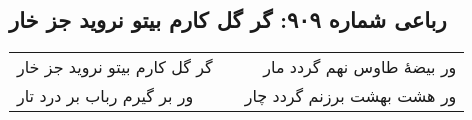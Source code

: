 \begin{center}
\section*{رباعی شماره ۹۰۹: گر گل کارم بیتو نروید جز خار}
\label{sec:0909}
\begin{longtable}{l p{0.5cm} r}
گر گل کارم بیتو نروید جز خار
&&
ور بیضهٔ طاوس نهم گردد مار
\\
ور بر گیرم رباب بر درد تار
&&
ور هشت بهشت برزنم گردد چار
\\
\end{longtable}
\end{center}
